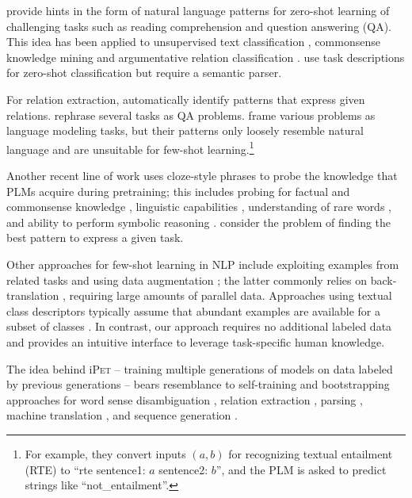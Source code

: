 \citet{radford2018language} provide hints in the form of natural language patterns for zero-shot learning of challenging tasks such as reading comprehension and question answering (QA). This idea has been applied to unsupervised text classification \citep{puri2019zeroshot}, commonsense knowledge mining \citep{davison-etal-2019-commonsense} and argumentative relation classification \citep{opitz2019argumentative}. \citet{srivastava-etal-2018-zero} use task descriptions for zero-shot classification but require a semantic parser. 

For relation extraction, \citet{bouraoui2020inducing} automatically identify patterns that express given relations. \citet{mccann2018natural} rephrase several tasks as QA problems. \citet{raffel2019exploring} frame various problems as language modeling tasks, but their patterns only loosely resemble natural language and are unsuitable for few-shot learning.\footnote{For example, they convert inputs $(a,b)$ for recognizing textual entailment (RTE) to ``rte sentence1: $a$ sentence2: $b$'', and the PLM is asked to predict strings like ``not\_entailment''.}

Another recent line of work uses cloze-style phrases to probe the knowledge that PLMs acquire during pretraining; this includes probing for factual and commonsense knowledge \citep{trinh2018simple,Petroni_2019,wang-etal-2019-make,sakaguchi2019winogrande}, linguistic capabilities \citep{ettinger2020bert,kassner2019negated}, understanding of rare words \citep{schick2019ota}, and ability to perform symbolic reasoning \citep{talmor2019olmpics}. \citet{jiang2019know} consider the problem of finding the best pattern to express a given task.

Other approaches for few-shot learning in NLP include exploiting examples from related tasks \citep{yu-etal-2018-diverse,gu-etal-2018-meta,dou-etal-2019-investigating,qian-yu-2019-domain,yin2019benchmarking} and using data augmentation \citep{xie2019unsupervised,chen2020mixtext}; the latter commonly relies on back-translation \citep{sennrich-etal-2016-improving}, requiring large amounts of parallel data. Approaches using textual class descriptors typically assume that abundant examples are available for a subset of classes \citep[e.g.,][]{romera2015embarrassingly,veeranna2016using,ye-etal-2020-zero}. In contrast, our approach requires no additional labeled data and provides an intuitive interface to leverage task-specific human knowledge. 

The idea behind i\textsc{Pet} -- training multiple generations of models on data labeled by previous generations -- bears resemblance to self-training and bootstrapping approaches for word sense disambiguation \citep{yarowsky-1995-unsupervised}, relation extraction \citep{brin1999extracting,agichtein2000snowball,batista-etal-2015-semi}, parsing \citep{mcclosky-etal-2006-effective,reichart-rappoport-2007-self,huang-harper-2009-self}, machine translation \citep{hoang-etal-2018-iterative}, and sequence generation \citep{He2020Revisiting}.

